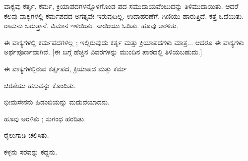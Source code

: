 \begin{kbvrule}
\noindent\kbvbullet\hspace{0.5em}ವಾಕ್ಯವು ಕರ್ತೃ, ಕರ್ಮ, ಕ್ರಿಯಾಪದಗಳನ್ನೊಳಗೊಂಡ ಪದ ಸಮುದಾಯವೆಂಬುದನ್ನು ತಿಳಿಮುದಾಯಿತು. ಆದರೆ ಕೆಲವು ವಾಕ್ಯಗಳಲ್ಲಿ ಕರ್ಮಪದದ ಅಗತ್ಯವೇ ಇರುವುದಿಲ್ಲ. ಉದಾಹರಣೆಗೆ, ಗಿಣಿಯು ಹಾರುತ್ತಿದೆ. ಕತ್ತೆ ಒದೆಯಿತು. ರಾಮನು ಬರುತ್ತಾನೆ. ವಿಮಾನ ಇಳಿಯಿತು. ನಾಯಿಯು ಓಡಿತು. ಹೂವು ಅರಳಿತು.
\end{kbvrule}

\indent ಈ ವಾಕ್ಯಗಳಲ್ಲಿ ಕರ್ಮಪದಗಳಿಲ್ಲ ; ಇಲ್ಲಿರುವುದು ಕರ್ತೃ ಮತ್ತು ಕ್ರಿಯಾಪದಗಳು ಮಾತ್ರ... ಆದರೂ ಈ ವಾಕ್ಯಗಳು ಅರ್ಥಪೂರ್ಣವಾಗಿವೆ. {[}ಈ ಬಗ್ಗೆ ಹೆಚ್ಚಿನ ವಿವರಗಳನ್ನು ಮುಂದಿನ ಪಾಠದಲ್ಲಿ ತಿಳಿಯಬಹುದು.{]}\par


\vspace{2.5pt plus 3pt minus 0.5pt}\noindent\hspace*{1.2em}\hspace{0.55em}ಈ ವಾಕ್ಯಗಳಲ್ಲಿರುವ ಕರ್ತೃಪದ, ಕ್ರಿಯಾಪದ ಮತ್ತು ಕರ್ಮ\par


\vspace{2.5pt plus 3pt minus 0.5pt}\noindent\hspace*{1.2em}\hspace{0.55em}ಚಿರತೆಯು ಹಸುವನ್ನು ಕೊಂದಿತು.\par

\vspace{2.5pt plus 3pt minus 0.5pt}\noindent\hspace*{1.2em}\hspace{0.55em}ಭೀಮಸೇನನು ಹಿಡಂಬಿಯನ್ನು ಮದುವೆಯಾದನು.\par

\vspace{2.5pt plus 3pt minus 0.5pt}\noindent\hspace*{1.2em}\hspace{0.55em}ಹೂವು ಅರಳಿತು ; ಸುಗಂಧ ಹರಡಿತು.\par

\vspace{2.5pt plus 3pt minus 0.5pt}\noindent\hspace*{1.2em}\hspace{0.55em}ರೈಲುಗಾಡಿ ಚಲಿಸಿತು.\par

\vspace{2.5pt plus 3pt minus 0.5pt}\noindent\hspace*{1.2em}\hspace{0.55em}ಕಳ್ಳನು ಸರವನ್ನು ಕದ್ದನು.\par

